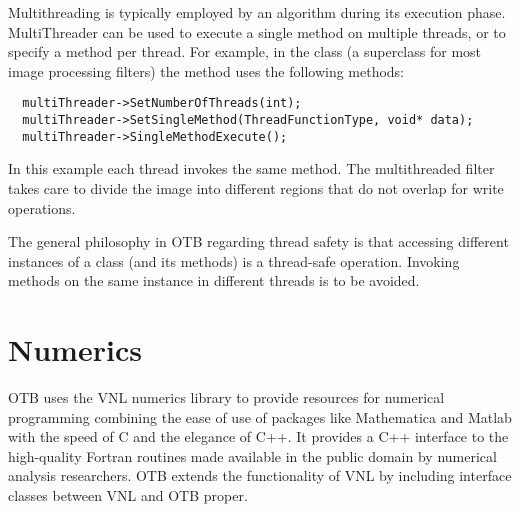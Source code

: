 Multithreading is typically employed by an algorithm during its execution
phase. MultiThreader can be used to execute a single method on
multiple threads, or to specify a method per thread. For example, in the 
class  (a superclass for most image processing filters)
the  method uses the following methods:

\small
\begin{verbatim}
  multiThreader->SetNumberOfThreads(int);
  multiThreader->SetSingleMethod(ThreadFunctionType, void* data);
  multiThreader->SingleMethodExecute();
\end{verbatim}
\normalsize

In this example each thread invokes the same method. The multithreaded filter
takes care to divide the image into different regions that do not overlap for
write operations.

The general philosophy in OTB regarding thread safety is that accessing
different instances of a class (and its methods) is a thread-safe operation.
Invoking methods on the same instance in different threads is to be avoided.


\section{Numerics}
\label{sec:Numerics}


OTB uses the VNL numerics library to provide resources for numerical
programming combining the ease of use of packages like Mathematica and Matlab
with the speed of C and the elegance of C++. It provides a C++ interface to
the high-quality Fortran routines made available in the public domain by
numerical analysis researchers. OTB extends the functionality of VNL
by including interface classes between VNL and OTB proper.

